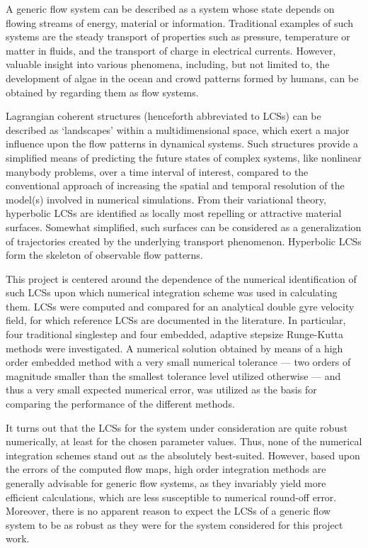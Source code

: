 A generic flow system can be described as a system whose state depends on
flowing streams of energy, material or information. Traditional examples of
such systems are the steady transport of properties such as pressure,
temperature or matter in fluids, and the transport of charge in electrical
currents. However, valuable insight into various phenomena, including, but not
limited to, the development of algae in the ocean and crowd patterns formed
by humans, can be obtained by regarding them as flow systems.

Lagrangian coherent structures (henceforth abbreviated to LCSs) can be described
as `landscapes' within a multidimensional space, which exert a major influence
upon the flow patterns in dynamical systems. Such structures provide a
simplified means of predicting the future states of complex systems, like
nonlinear manybody problems, over a time interval of interest, compared to the
conventional approach of increasing the spatial and temporal resolution of the
model(s) involved in numerical simulations. From their variational theory,
hyperbolic LCSs are identified as locally most repelling or attractive material
surfaces. Somewhat simplified, such surfaces can be considered as a
generalization of trajectories created by the underlying transport phenomenon.
Hyperbolic LCSs form the skeleton of observable flow patterns.

This project is centered around the dependence of the numerical identification
of such LCSs upon which numerical integration scheme was used in calculating
them. LCSs were computed and compared for an analytical double gyre velocity
field, for which reference LCSs are documented in the literature. In particular,
four traditional singlestep and four embedded, adaptive stepsize Runge-Kutta
methods were investigated. A numerical solution obtained by means of a high
order embedded method with a very small numerical tolerance --- two orders of
magnitude smaller than the smallest tolerance level utilized otherwise ---
and thus a very small expected numerical error, was utilized as the basis
for comparing the performance of the different methods.

It turns out that the LCSs for the system under consideration are quite robust
numerically, at least for the chosen parameter values. Thus, none of the
numerical integration schemes stand out as the absolutely best-suited. However,
based upon the errors of the computed flow maps, high order integration
methods are generally advisable for generic flow systems, as they invariably
yield more efficient calculations, which are less susceptible to numerical
round-off error. Moreover, there is no apparent reason to expect the LCSs of
a generic flow system to be as robust as they were for the system considered
for this project work.

